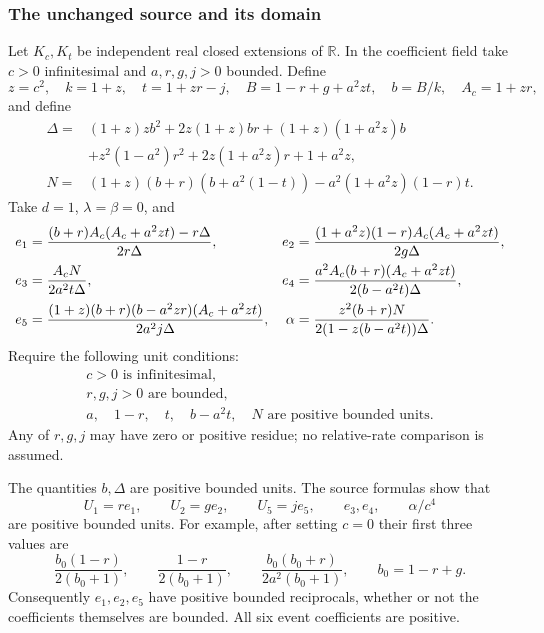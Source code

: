 \subsubsection*{The unchanged source and its domain}
Let $K_c,K_t$ be independent real closed extensions of $\mathbb R$.
In the coefficient field take $c>0$ infinitesimal and $a,r,g,j>0$ bounded.
Define
\[
 z=c^2,\quad k=1+z,\quad t=1+zr-j,\quad
 B=1-r+g+a^2zt,\quad b=B/k,\quad A_c=1+zr,
\]
and define
\begin{align*}
\Delta={}&(1+z)zb^2+2z(1+z)br+(1+z)(1+a^2z)b\\
 &+z^2(1-a^2)r^2+2z(1+a^2z)r+1+a^2z,\\
N={}&(1+z)(b+r)(b+a^2(1-t))-a^2(1+a^2z)(1-r)t.
\end{align*}
Take $d=1$, $\lambda=\beta=0$, and
\begin{align}
e_1&=\frac{(b+r)A_c(A_c+a^2zt)-r\Delta}{2r\Delta},&
e_2&=\frac{(1+a^2z)(1-r)A_c(A_c+a^2zt)}{2g\Delta},\notag\\
e_3&=\frac{A_cN}{2a^2t\Delta},&
e_4&=\frac{a^2A_c(b+r)(A_c+a^2zt)}{2(b-a^2t)\Delta},\notag\\
e_5&=\frac{(1+z)(b+r)(b-a^2zr)(A_c+a^2zt)}{2a^2j\Delta},&
\alpha&=\frac{z^2(b+r)N}{2(1-z(b-a^2t))\Delta}.
\label{p9f1235511111:eq:c2u-source}
\end{align}
Require the following unit conditions:
\begin{equation}
\begin{gathered}
c>0\text{ is infinitesimal},\\
r,g,j>0\text{ are bounded},\\
a,\quad 1-r,\quad t,\quad b-a^2t,\quad N
\text{ are positive bounded units}.
\end{gathered}\label{p9f1235511111:eq:c2u-hyp}
\end{equation}
Any of $r,g,j$ may have zero or positive residue; no relative-rate
comparison is assumed.

The quantities $b,\Delta$ are positive bounded units.  The source formulas
show that
\begin{equation}
U_1=re_1,\qquad U_2=ge_2,\qquad U_5=je_5,
\qquad e_3,e_4,\qquad \alpha/c^4
\label{p9f1235511111:eq:c2u-units}
\end{equation}
are positive bounded units.  For example, after setting $c=0$ their
first three values are
\[
\frac{b_0(1-r)}{2(b_0+1)},\qquad
\frac{1-r}{2(b_0+1)},\qquad
\frac{b_0(b_0+r)}{2a^2(b_0+1)},\qquad b_0=1-r+g.
\]
Consequently $e_1,e_2,e_5$ have positive bounded reciprocals, whether or
not the coefficients themselves are bounded.  All six event coefficients
are positive.

